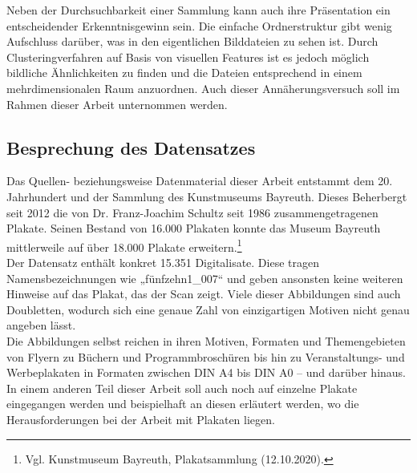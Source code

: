 \documentclass[a4paper,12pt,ngerman]{article}
\begin{document}
Neben der Durchsuchbarkeit einer Sammlung kann auch ihre Präsentation ein entscheidender Erkenntnisgewinn sein. Die einfache Ordnerstruktur gibt wenig Aufschluss darüber, was in den eigentlichen Bilddateien zu sehen ist. Durch Clusteringverfahren auf Basis von visuellen Features ist es jedoch möglich bildliche Ähnlichkeiten zu finden und die Dateien entsprechend in einem mehrdimensionalen Raum anzuordnen. Auch dieser Annäherungsversuch soll im Rahmen dieser Arbeit unternommen werden. \\

\subsection{Besprechung des Datensatzes}
Das Quellen- beziehungsweise Datenmaterial dieser Arbeit entstammt dem 20. Jahrhundert und der Sammlung des Kunstmuseums Bayreuth. Dieses Beherbergt seit 2012 die von Dr. Franz-Joachim Schultz seit 1986 zusammengetragenen Plakate. Seinen Bestand von 16.000 Plakaten konnte das Museum Bayreuth mittlerweile auf über 18.000 Plakate erweitern.\footnote{Vgl. Kunstmuseum Bayreuth, Plakatsammlung (12.10.2020).} \\
Der Datensatz enthält konkret 15.351 Digitalisate. Diese tragen Namensbezeichnungen wie „fünfzehn1\_007“ und geben ansonsten keine weiteren Hinweise auf das Plakat, das der Scan zeigt. Viele dieser Abbildungen sind auch Doubletten, wodurch sich eine genaue Zahl von einzigartigen Motiven nicht genau angeben lässt. \\
Die Abbildungen selbst reichen in ihren Motiven, Formaten und Themengebieten von Flyern zu Büchern und Programmbroschüren bis hin zu Veranstaltungs- und Werbeplakaten in Formaten zwischen DIN A4 bis DIN A0 – und darüber hinaus. In einem anderen Teil dieser Arbeit soll auch noch auf einzelne Plakate eingegangen werden und beispielhaft an diesen erläutert werden, wo die Herausforderungen bei der Arbeit mit Plakaten liegen. \\
\end{document}
